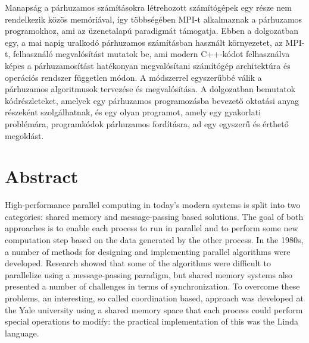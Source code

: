 Manapság a párhuzamos számításokra létrehozott számítógépek egy része nem rendelkezik közös memóriával, így többségében MPI-t alkalmaznak a párhuzamos programokhoz, ami az üzenetalapú paradigmát támogatja. Ebben a dolgozatban egy, a mai napig uralkodó párhuzamos számításban használt környezetet, az MPI-t, felhasználó megvalósítást mutatok be, ami modern C++-kódot felhasználva képes a párhuzamosítást hatékonyan megvalósítani számítógép architektúra és operációs rendszer független módon. A módszerrel egyszerűbbé válik a párhuzamos algoritmusok tervezése és megvalósítása. A dolgozatban bemutatok kódrészleteket, amelyek egy párhuzamos programozásba bevezető oktatási anyag részeként szolgálhatnak, és egy olyan programot, amely egy gyakorlati problémára, programkódok párhuzamos fordításra, ad egy egyszerű és érthető megoldást.

\vfill
\selectenglish


\chapter*{Abstract}

High-performance parallel computing in today's modern systems is split into two categories: shared memory and message-passing based solutions. The goal of both approaches is to enable each process to run in parallel and to perform some new computation step based on the data generated by the other process. In the 1980s, a number of methods for designing and implementing parallel algorithms were developed. Research showed that some of the algorithms were difficult to parallelize using a message-passing paradigm, but shared memory systems also presented a number of challenges in terms of synchronization. To overcome these problems, an interesting, so called coordination based, approach was developed at the Yale university using a shared memory space that each process could perform special operations to modify: the practical implementation of this was the Linda language.

